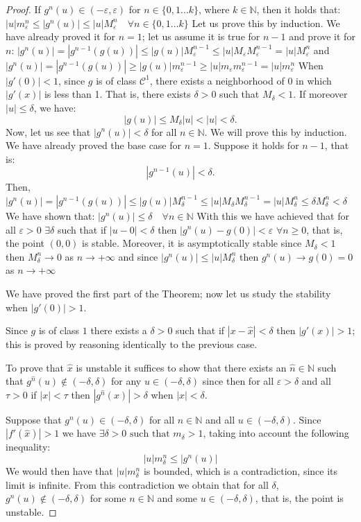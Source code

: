 \documentclass[12pt,a4paper]{report}
\theoremstyle{definition}
\begin{document}
\begin{proof}
If $g^n(u) \in (-\varepsilon,\varepsilon)$ for $n \in \{0,1 \ldots k\}$, where $k \in \mathbb{N}$, then it holds that:
$
|u|  m^n_\varepsilon \leq |g^n(u)| \leq  |u|  M^n_\varepsilon \quad \forall n \in \{0,1 \ldots k\}
$
%
Let us prove this by induction. We have already proved it for $n = 1$; let us assume it is true for $n-1$ and prove it for $n$:
$|g^n(u)| = |g^{n-1}(g(u))| \leq |g(u)|M_\varepsilon^{n-1} \leq |u|M_\varepsilon M_\varepsilon^{n-1} = |u| M_\varepsilon^{n}$
and
%
$|g^n(u)| = |g^{n-1}(g(u))| \geq |g(u)|m_\varepsilon^{n-1} \geq |u|m_\varepsilon m_\varepsilon^{n-1} = |u| m_\varepsilon^{n}$
%
When \( |g'(0)| < 1 \), since \( g \) is of class \( \mathcal{C}^1 \), there exists a neighborhood of \( 0 \) in which \( |g'(x)| \) is less than 1. That is, there exists \( \delta > 0 \) such that \( M_\delta < 1 \). If moreover \( |u| \leq \delta \), we have:
\[
|g(u)| \leq M_\delta |u| < |u| < \delta.
\]
%
Now, let us see that \( |g^n(u)| < \delta \) for all \( n \in \mathbb{N} \). We will prove this by induction. We have already proved the base case for \( n = 1 \). Suppose it holds for \( n - 1 \), that is:
\[
|g^{n-1}(u)| < \delta.
\]
Then,
$
|g^n(u)|  = |g^{n-1}(g(u))| \leq |g(u)|  M^{n-1}_\delta   \leq |u| M_\delta  M^{n-1}_\delta = |u|  M^{n}_\delta   \leq \delta  M^n_\delta    < \delta
$
%
We have shown that:
$ |g^n(u)| \leq \delta \quad \forall n \in \mathbb{N}$
%
With this we have achieved that for all $\varepsilon  > 0$ $  \exists  \delta  $ such that if $ |u-0| < \delta $ then $ |g^n(u) - g(0)| < \varepsilon$  $ \forall n \geq 0 $, that is, the point $(0,0)$ is stable. 
Moreover, it is asymptotically stable since $ M_\delta  < 1$ then $ M^n_\delta  \rightarrow 0$ as $n \rightarrow +\infty$ and since $|g^n(u)| \leq |u| M^n_\delta   $ then $ g^n(u) \rightarrow g(0)=0$ as $n \rightarrow +\infty$

We have proved the first part of the Theorem; now let us study the stability when $|g'(0)| > 1$.

Since $g$ is of class $1$ there exists a $\delta > 0$ such that if $|x - \hat{x}| < \delta$ then $|g'(x)| > 1$; this is proved by reasoning identically to the previous case. 

To prove that $\hat{x}$ is unstable it suffices to show that there exists an  $\hat{n} \in \mathbb{N}$ such that $g^{\hat{n}}(u) \notin (-\delta,\delta)$ for any $u \in (-\delta,\delta)$ since then for all $\varepsilon > \delta$ and all $\tau > 0$ if $|x| < \tau$ then $|g^{\hat{n}}(x)| > \delta $ when $|x| < \delta$.

Suppose that $g^n(u) \in (-\delta,\delta)$ for all $n \in \mathbb{N}$ and all $u \in (-\delta,\delta)$.
Since $|f'(\hat{x})| > 1$ we have $ \exists \delta > 0 \text{ such that } m_\delta > 1$, taking into account the following inequality:
\[
|u| m^n_\delta \leq |g^n(u)|
\]
%
We would then have that $|u|m^n_{\delta}$ is bounded, which is a contradiction, since its limit is infinite. From this contradiction we obtain that for all $\delta$, $g^n(u) \notin (-\delta,\delta)$ for some $n\in\mathbb{N}$ and some $u\in (-\delta,\delta)$, that is, the point is unstable.

\end{proof}
\end{document}

